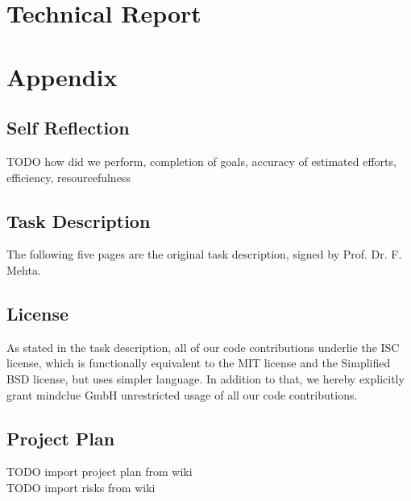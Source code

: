 \documentclass[a4paper]{report}
\begin{document}
\part{Technical Report}






\printbibliography
\printglossaries

\appendix
\part{Appendix}
\chapter{Self Reflection}
TODO how did we perform, completion of goals, accuracy of estimated efforts, efficiency, resourcefulness

\chapter{Task Description}\label{ch:task-desc}
The following five pages are the original task description, signed by Prof. Dr. F. Mehta.


\chapter{License}
As stated in the task description, all of our code contributions underlie the
ISC license, which is functionally equivalent to the MIT license and the
Simplified BSD license, but uses simpler language. In addition to that, we
hereby explicitly grant mindclue GmbH unrestricted usage of all our code
contributions.


\chapter{Project Plan}
TODO import project plan from wiki\\
TODO import risks from wiki\\



\end{document}
